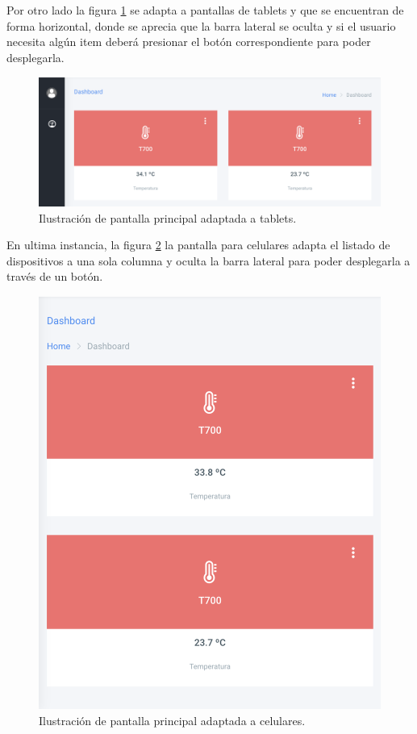 Por otro lado la figura \ref{fig:pantalla-tablet} se adapta a pantallas de tablets y que se encuentran de forma horizontal, donde se aprecia que la barra lateral se oculta y si el usuario necesita algún item deberá presionar el botón correspondiente para poder desplegarla. 

\begin{figure}[htpb]
	\centering
	\includegraphics[scale=.25]{./Figures/pantalla-tablet.png}
	\caption[Pantalla adaptada a tablets]{Ilustración de pantalla principal adaptada a tablets.}
	\label{fig:pantalla-tablet}
\end{figure}

En ultima instancia, la figura \ref{fig:pantalla-celu} la pantalla para celulares adapta el listado de dispositivos a una sola columna y oculta la barra lateral para poder desplegarla a través de un botón.

\begin{figure}[htpb]
	\centering
	\includegraphics[scale=.20]{./Figures/pantalla-celu.png}
	\caption[Pantalla adaptada a celulares]{Ilustración de pantalla principal adaptada a celulares.}
	\label{fig:pantalla-celu}
\end{figure}


